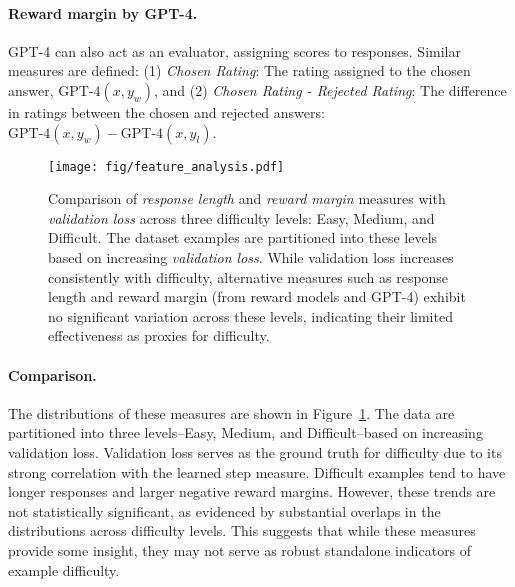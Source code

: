 \paragraph{Reward margin by GPT-4.} GPT-4 can also act as an evaluator, assigning scores to responses. Similar measures are defined: (1) \textit{Chosen Rating}: The rating assigned to the chosen answer, $\text{GPT-4}(x,y_w)$, and (2) \textit{Chosen Rating - Rejected Rating}: The difference in ratings between the chosen and rejected answers: $\text{GPT-4}(x,y_w) - \text{GPT-4}(x,y_l)$. 

\begin{figure}[!h]
    \centering
    \texttt{[image: fig/feature\_analysis.pdf]}
    \vspace{-0.8cm}
    \caption{Comparison of \textit{response length} and \textit{reward margin} measures with \textit{validation loss} across three difficulty levels: Easy, Medium, and Difficult. The dataset examples are partitioned into these levels based on increasing \textit{validation loss}. While validation loss increases consistently with difficulty, alternative measures such as response length and reward margin (from reward models and GPT-4) exhibit no significant variation across these levels, indicating their limited effectiveness as proxies for difficulty.}
    \label{fig:feature-analysis}
\end{figure}

\paragraph{Comparison.} The distributions of these measures are shown in Figure~\ref{fig:feature-analysis}. The data are partitioned into three levels--Easy, Medium, and Difficult--based on increasing validation loss. 
Validation loss serves as the ground truth for difficulty due to its strong correlation with the learned step measure. Difficult examples tend to have longer responses and larger negative reward margins. 
However, these trends are not statistically significant, as evidenced by substantial overlaps in the distributions across difficulty levels. This suggests that while these measures provide some insight, they may not serve as robust standalone indicators of example difficulty. 



\clearpage
